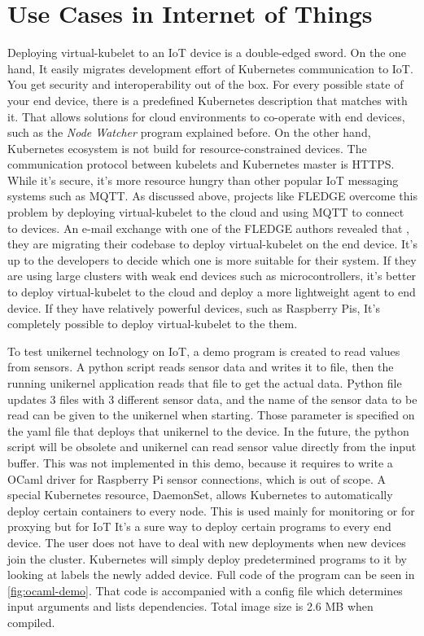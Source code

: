 \section{Use Cases in Internet of Things}

Deploying virtual-kubelet to an IoT device is a double-edged sword. On the one hand, It easily migrates development effort of Kubernetes communication to IoT. You get security and interoperability out of the box. For every possible state of your end device, there is a predefined Kubernetes description that matches with it. That allows solutions for cloud environments to co-operate with end devices, such as the \textit{Node Watcher} program explained before. On the other hand, Kubernetes ecosystem is not build for resource-constrained devices. The communication protocol between kubelets and Kubernetes master is HTTPS. While it's secure, it's more resource hungry than other popular IoT messaging systems such as MQTT. As discussed above, projects like FLEDGE overcome this problem by deploying virtual-kubelet to the cloud and using MQTT to connect to devices. An e-mail exchange with one of the FLEDGE authors revealed that , they are migrating their codebase to deploy virtual-kubelet on the end device. It's up to the developers to decide which one is more suitable for their system. If they are using large clusters with weak end devices such as microcontrollers, it's better to deploy virtual-kubelet to the cloud and deploy a more lightweight agent to end device. If they have relatively powerful devices, such as Raspberry Pis, It's completely possible to deploy virtual-kubelet to the them.

To test unikernel technology on IoT, a demo program is created to read values from sensors. A python script reads sensor data and writes it to file, then the running unikernel application reads that file to get the actual data. Python file updates 3 files with 3 different sensor data, and the name of the sensor data to be read can be given to the unikernel when starting. Those parameter is specified on the yaml file that deploys that unikernel to the device. In the future, the python script will be obsolete and unikernel can read sensor value directly from the input buffer. This was not implemented in this demo, because it requires to write a OCaml driver for Raspberry Pi sensor connections, which is out of scope. A special Kubernetes resource, DaemonSet, allows Kubernetes to automatically deploy certain containers to every node. This is used mainly for monitoring or for proxying but for IoT It's a sure way to deploy certain programs to every end device. The user does not have to deal with new deployments when new devices join the cluster. Kubernetes will simply deploy predetermined programs to it by looking at labels the newly added device. Full code of the program can be seen in \ref{fig:ocaml-demo}. That code is accompanied with a config file which determines input arguments and lists dependencies. Total image size is 2.6 MB when compiled.

